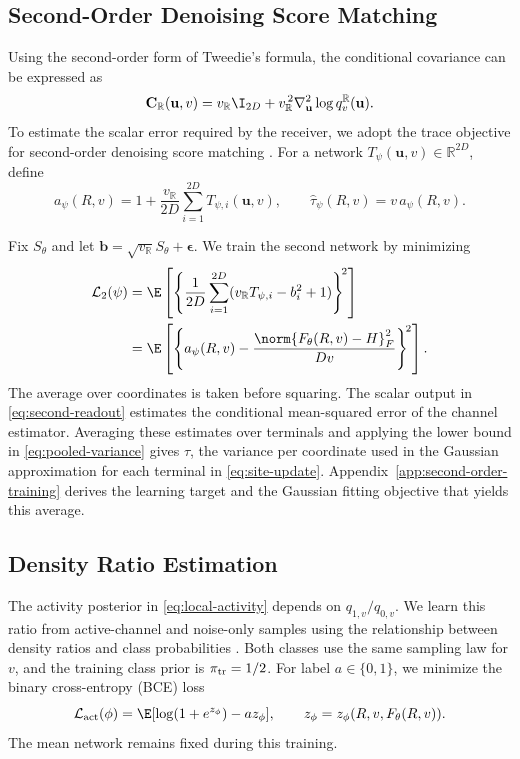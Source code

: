 \subsection{Second-Order Denoising Score Matching}
\label{sec:conditional-error}

Using the second-order form of Tweedie's formula, the conditional covariance
can be expressed as
\begin{equation}
 \mathbf C_{\mathbb R}(\mathbf u,v)
 =v_{\mathbb R}\I_{2D}
 +v_{\mathbb R}^{\,2}\nabla_{\mathbf u}^2\log q_v^{\mathbb R}(\mathbf u).
 \label{eq:tweedie-covariance}
\end{equation}
To estimate the scalar error required by the receiver, we adopt the
trace objective for second-order denoising score matching
\cite[Corollary~4.2]{lu2022}.
For a network $T_\psi(\mathbf u,v)\in\mathbb R^{2D}$, define
\begin{equation}
 a_\psi(R,v)=1+\frac{v_{\mathbb R}}{2D}
 \sum_{i=1}^{2D}T_{\psi,i}(\mathbf u,v),\qquad
 \widehat\tau_\psi(R,v)=v\,a_\psi(R,v).
 \label{eq:second-readout}
\end{equation}

Fix $S_\theta$ and let
$\mathbf b=\sqrt{v_{\mathbb R}}S_\theta+\bm\epsilon$.
We train the second network by minimizing
\begin{align}
 \mathcal L_2(\psi)
 &=\E\left[\left\{
 \frac1{2D}\sum_{i=1}^{2D}
 (v_{\mathbb R}T_{\psi,i}-b_i^2+1)\right\}^{\!2}\right]\notag\\*
 &=\E\left[\left\{
 a_\psi(R,v)-\frac{\norm{F_\theta(R,v)-H}_F^2}{Dv}
 \right\}^{\!2}\right].
 \label{eq:second-loss}
\end{align}
The average over coordinates is taken before squaring. The scalar
output in \eqref{eq:second-readout} estimates the conditional mean-squared
error of the channel estimator. Averaging these estimates over
terminals and applying the lower bound in \eqref{eq:pooled-variance}
gives $\tau$, the variance per coordinate used in the Gaussian
approximation for each terminal in \eqref{eq:site-update}.
Appendix~\ref{app:second-order-training} derives the learning target
and the Gaussian fitting objective that yields this average.

\subsection{Density Ratio Estimation}
\label{sec:density-ratio}

The activity posterior in \eqref{eq:local-activity} depends on
$q_{1,v}/q_{0,v}$. We learn this ratio from active-channel and noise-only
samples using the relationship between density ratios and class
probabilities \cite[Secs.~3 and 4.2]{menon2016}.
Both classes use the same sampling law for $v$, and the training class
prior is $\pi_{\rm tr}=1/2$.
For label $a\in\{0,1\}$, we minimize the binary cross-entropy (BCE) loss
\begin{equation}
 \mathcal L_{\rm act}(\phi)=
 \E[\log(1+e^{z_\phi})-a z_\phi],
 \qquad z_\phi=z_\phi(R,v,F_\theta(R,v)).
 \label{eq:classifier-loss}
\end{equation}
The mean network remains fixed during this training.

